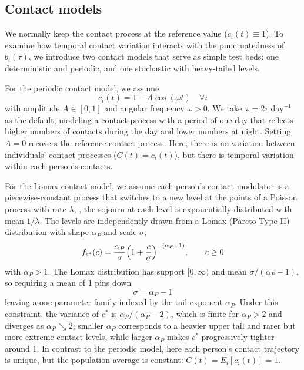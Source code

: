 \subsection{Contact models}

We normally keep the contact process at the reference value ($c_i(t) \equiv 1$). To examine how temporal contact variation interacts with the punctuatedness of $b_i(\tau)$, we introduce two contact models that serve as simple test beds: one deterministic and periodic, and one stochastic with heavy-tailed levels.

For the periodic contact model, we assume
%
\begin{equation}
    c_i(t) = 1 - A \cos(\omega t) \quad \forall i
    \label{eq:periodic_c}
\end{equation}
%
with amplitude $A \in [0,1]$ and angular frequency $\omega > 0$. We take $\omega = 2\pi\,\text{day}^{-1}$ as the default, modeling a contact process with a period of one day that reflects higher numbers of contacts during the day and lower numbers at night. Setting $A = 0$ recovers the reference contact process. Here, there is no variation between individuals' contact processes ($C(t) = c_i(t)$), but there is temporal variation within each person's contacts.

For the Lomax contact model, we assume each person's contact modulator is a piecewise-constant process that switches to a new level at the points of a Poisson process with rate $\lambda$, \ie, the sojourn at each level is exponentially distributed with mean $1/\lambda$. The levels are independently drawn from a Lomax (Pareto Type II) distribution with shape $\alpha_P$ and scale $\sigma$,
%
\begin{equation}
    f_{c^*}(c) = \frac{\alpha_P}{\sigma}\Bigl(1 + \frac{c}{\sigma}\Bigr)^{-(\alpha_P + 1)}, \qquad c \geq 0
    \label{eq:lomax_pdf}
\end{equation}
%
with $\alpha_P > 1$. The Lomax distribution has support $[0,\infty)$ and mean $\sigma / (\alpha_P - 1)$, so requiring a mean of 1 pins down
%
\begin{equation}
    \sigma = \alpha_P - 1
    \label{eq:lomax_scale}
\end{equation}
%
leaving a one-parameter family indexed by the tail exponent $\alpha_P$. Under this constraint, the variance of $c^*$ is $\alpha_P / (\alpha_P - 2)$, which is finite for $\alpha_P > 2$ and diverges as $\alpha_P \searrow 2$; smaller $\alpha_P$ corresponds to a heavier upper tail and rarer but more extreme contact levels, while larger $\alpha_P$ makes $c^*$ progressively tighter around 1. In contrast to the periodic model, here each person's contact trajectory is unique, but the population average is constant: $C(t) = E_i[c_i(t)] = 1$.

